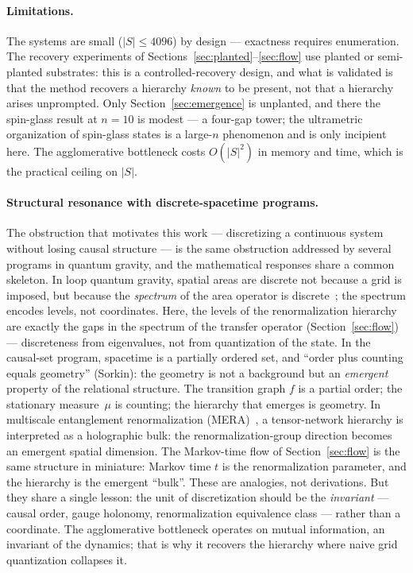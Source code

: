 \documentclass[11pt]{article}
\begin{document}
\paragraph{Limitations.}
The systems are small ($|S| \le 4096$) by design --- exactness requires
enumeration. The recovery experiments of
Sections~\ref{sec:planted}--\ref{sec:flow} use planted or semi-planted
substrates: this is a controlled-recovery design, and what is validated is that
the method recovers a hierarchy \emph{known} to be present, not that a
hierarchy arises unprompted. Only Section~\ref{sec:emergence} is unplanted, and
there the spin-glass result at $n{=}10$ is modest --- a four-gap tower; the
ultrametric organization of spin-glass states is a large-$n$ phenomenon and is
only incipient here. The agglomerative bottleneck costs $O(|S|^2)$ in memory
and time, which is the practical ceiling on $|S|$.

\paragraph{Structural resonance with discrete-spacetime programs.}
The obstruction that motivates this work --- discretizing a continuous system
without losing causal structure --- is the same obstruction addressed by several
programs in quantum gravity, and the mathematical responses share a common
skeleton.  In loop quantum gravity, spatial areas are discrete not because a
grid is imposed, but because the \emph{spectrum} of the area operator is
discrete~\cite{Rovelli1995}; the spectrum encodes levels, not coordinates.
Here, the levels of the renormalization hierarchy are exactly the gaps in the
spectrum of the transfer operator (Section~\ref{sec:flow}) --- discreteness
from eigenvalues, not from quantization of the state.
In the causal-set program, spacetime is a partially ordered set, and
``order plus counting equals geometry'' (Sorkin): the geometry is not
a background but an \emph{emergent} property of the relational structure.
The transition graph $f$ is a partial order; the stationary measure~$\mu$
is counting; the hierarchy that emerges is geometry.
In multiscale entanglement renormalization (MERA)~\cite{Vidal2007}, a
tensor-network hierarchy is interpreted as a holographic bulk: the
renormalization-group direction becomes an emergent spatial dimension.
The Markov-time flow of Section~\ref{sec:flow} is the same structure in
miniature: Markov time $t$ is the renormalization parameter, and the hierarchy
is the emergent ``bulk''.
These are analogies, not derivations.  But they share a single lesson:
the unit of discretization should be the \emph{invariant} --- causal order,
gauge holonomy, renormalization equivalence class --- rather than a coordinate.
The agglomerative bottleneck operates on mutual information, an invariant of
the dynamics; that is why it recovers the hierarchy where naive grid
quantization collapses it.
\end{document}
